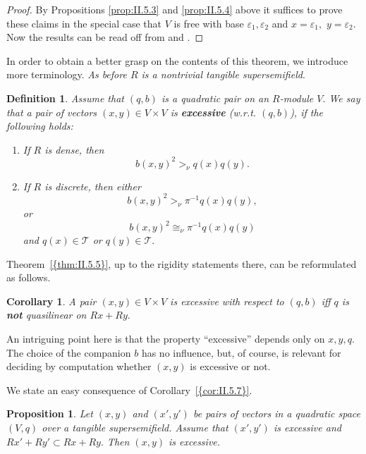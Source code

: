 \documentclass [12pt,a4paper,reqno]{amsart}
\newtheorem{cor}[thm]{Corollary}
\newtheorem{prop}[thm]{Proposition}
\newtheorem{defn}[thm]{Definition}
\begin{document}
\begin{proof}
By Propositions \ref{prop:II.5.3} and \ref{prop:II.5.4} above it
suffices to prove these claims in the special case that $V$ is
free with base ${\varepsilon}_1,{\varepsilon}_2$ and
$x={\varepsilon}_1,$ $y={\varepsilon}_2.$ Now the results can be read
off from {\cite[Proposition~{{7.9}}]{QF1}} and \cite[Theorems 7.11 and 7.12]{QF1}.
\end{proof}

In order to obtain a better grasp on the contents of this theorem,
we introduce more terminology. \textit{As before $R$ is a nontrivial tangible
supersemifield}.

\begin{defn}\label{defn:II.5.6}
Assume that $(q,b)$ is a quadratic pair on an $R$-module $V.$ We
say that a pair of vectors $(x,y)\in V\times V$ is
{\textbf{{excessive}}} (w.r.t. $(q,b)$), if the following holds:
\begin{enumerate}
\item[a)] If $R$ is dense, then
$$b(x,y)^2>_\nu q(x)q(y).$$
{\vskip 1.5mm \noindent}

\item[b)] If $R$ is discrete, then either
$$b(x,y)^2>_\nu \pi^{-1}q(x)q(y),$$
or
$$b(x,y)^2\cong_\nu \pi^{-1}q(x)q(y)$$
and $q(x)\in {\mathcal T}$ or $q(y)\in {\mathcal T}.$\end{enumerate}\end{defn}

{Theorem~\ref{{thm:II.5.5}}}, up to the rigidity statements there, can be
reformulated as follows.

\begin{cor}\label{cor:II.5.7}
A pair $(x,y)\in V\times V$ is excessive with respect to $(q,b)$
iff $q$ is {\textbf{{not}}} quasilinear on $Rx+Ry.$\end{cor}

An intriguing point here is that the property ``excessive''
depends only on $x,y,q.$ The choice of the companion $b$ has no
influence, but, of course, is relevant for deciding by computation
whether $(x,y)$ is excessive or not.

We state an easy consequence of {Corollary~\ref{{cor:II.5.7}}}.

\begin{prop}\label{prop:II.5.8}
Let $(x,y)$ and $(x',y')$ be pairs of vectors in a quadratic space
$(V,q)$ over a tangible supersemifield. Assume that $(x',y')$ is
excessive and $Rx'+Ry'\subset Rx+Ry.$ Then $(x,y)$ is excessive.
\end{prop}
\end{document}
